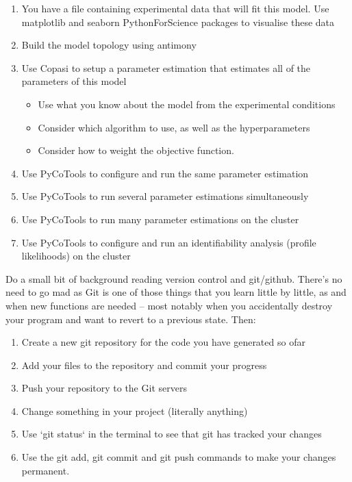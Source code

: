 \documentclass[11pt]{article}
\begin{document}
    \begin{enumerate}
        \item You have a file containing experimental data that will fit this model. Use matplotlib and seaborn PythonForScience packages to visualise these data
        \item Build the model topology using antimony
        \item Use Copasi to setup a parameter estimation that estimates all of the parameters of this model
        \begin{itemize}
            \item Use what you know about the model from the experimental conditions
            \item Consider which algorithm to use, as well as the hyperparameters
            \item Consider how to weight the objective function.
        \end{itemize}
        \item Use PyCoTools to configure and run the same parameter estimation
        \item Use PyCoTools to run several parameter estimations simultaneously
        \item Use PyCoTools to run many parameter estimations on the cluster
        \item Use PyCoTools to configure and run an identifiability analysis (profile likelihoods) on the cluster
    \end{enumerate}

    Do a small bit of background reading version control and git/github. There's no need to go mad
    as Git is one of those things that you learn little by little, as and when new functions are needed -- most notably
    when you accidentally destroy your program and want to revert to a previous state. Then:

    \begin{enumerate}
        \item Create a new git repository for the code you have generated so ofar
        \item Add your files to the repository and commit your progress
        \item Push your repository to the Git servers
        \item Change something in your project (literally anything)
        \item Use `git status` in the terminal to see that git has tracked your changes
        \item Use the git add, git commit and git push commands to make your changes permanent.
    \end{enumerate}
\end{document}

